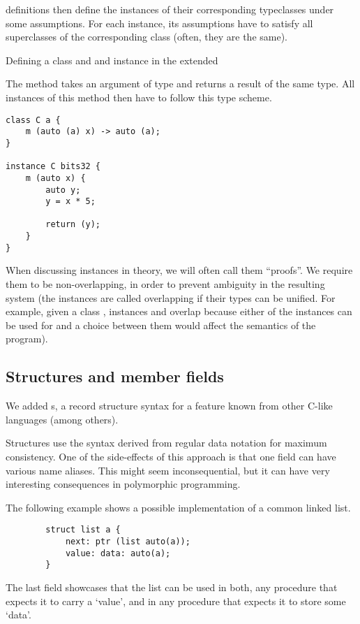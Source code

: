  definitions then define the instances of their corresponding typeclasses under some assumptions. For each instance, its assumptions have to satisfy all superclasses of the corresponding class (often, they are the same).

\begin{codex}
    \caption{Defining a class and and instance in the extended \cmm}
    \label{cex:classInstance}

    \begin{flushleft}
        \noindent The method  takes an argument of type  and returns a result of the same type. All instances of this method then have to follow this type scheme.
    \end{flushleft}

    \begin{lstlisting}
class C a {
    m (auto (a) x) -> auto (a);
}

instance C bits32 {
    m (auto x) {
        auto y;
        y = x * 5;

        return (y);
    }
}
    \end{lstlisting}
\end{codex}

When discussing instances in theory, we will often call them ``proofs''. We require them to be non-overlapping, in order to prevent ambiguity in the resulting system (the instances are called overlapping if their types can be unified. For example, given a class , instances  and  overlap because either of the instances can be used for  and a choice between them would affect the semantics of the program).

\subsection{Structures and member fields}
\label{sec:structExt}

We added s, a record structure syntax for a feature known from other C-like languages (among others).

Structures use the syntax derived from regular data notation for maximum consistency. One of the side-effects of this approach is that one field can have various name aliases. This might seem inconsequential, but it can have very interesting consequences in polymorphic programming.

\begin{ex}
    \label{list_ex}
    The following example shows a possible implementation of a common linked list.

    \begin{lstlisting}
        struct list a {
            next: ptr (list auto(a));
            value: data: auto(a);
        }
    \end{lstlisting}

    The last field showcases that the list can be used in both, any procedure that expects it to carry a `value', and in any procedure that expects it to store some `data'.
\end{ex}

